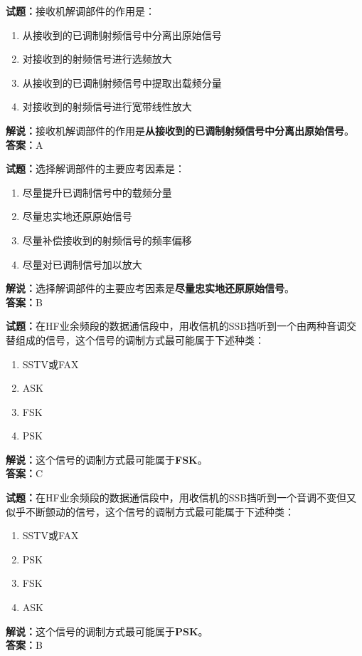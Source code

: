 \documentclass{ctexbook}
\begin{document}
\bigskip


\noindent\textbf{试题：}接收机解调部件的作用是：
\begin{enumerate}[leftmargin=3em]
\item 从接收到的已调制射频信号中分离出原始信号
\item 对接收到的射频信号进行选频放大
\item 从接收到的已调制射频信号中提取出载频分量
\item 对接收到的射频信号进行宽带线性放大
\end{enumerate}
\noindent\textbf{解说：}接收机解调部件的作用是\textbf{从接收到的已调制射频信号中分离出原始信号}。\\\noindent\textbf{答案：}A



\bigskip


\noindent\textbf{试题：}选择解调部件的主要应考因素是：
\begin{enumerate}[leftmargin=3em]
\item 尽量提升已调制信号中的载频分量
\item 尽量忠实地还原原始信号
\item 尽量补偿接收到的射频信号的频率偏移
\item 尽量对已调制信号加以放大
\end{enumerate}
\noindent\textbf{解说：}选择解调部件的主要应考因素是\textbf{尽量忠实地还原原始信号}。\\\noindent\textbf{答案：}B




\bigskip


\noindent\textbf{试题：}在HF业余频段的数据通信段中，用收信机的SSB挡听到一个由两种音调交替组成的信号，这个信号的调制方式最可能属于下述种类：
\begin{enumerate}[leftmargin=3em]
\item SSTV或FAX
\item ASK
\item FSK
\item PSK
\end{enumerate}
\noindent\textbf{解说：}这个信号的调制方式最可能属于\textbf{FSK}。\\\noindent\textbf{答案：}C




\bigskip


\noindent\textbf{试题：}在HF业余频段的数据通信段中，用收信机的SSB挡听到一个音调不变但又似乎不断颤动的信号，这个信号的调制方式最可能属于下述种类：
\begin{enumerate}[leftmargin=3em]
\item SSTV或FAX
\item PSK
\item FSK
\item ASK
\end{enumerate}
\noindent\textbf{解说：}这个信号的调制方式最可能属于\textbf{PSK}。\\\noindent\textbf{答案：}B
\end{document}

